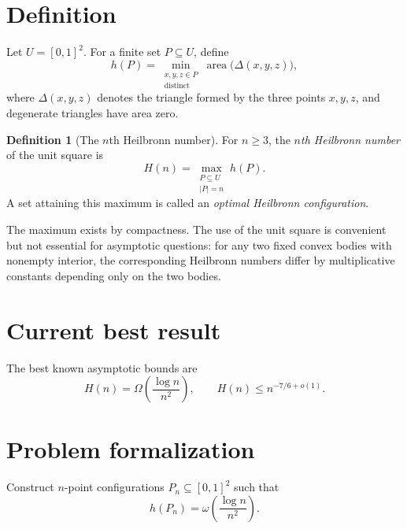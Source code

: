 \documentclass[11pt,a4paper]{article}
\newcommand{\Area}{\operatorname{area}}
\theoremstyle{definition}
\newtheorem{definition}{Definition}
\begin{document}
\section{Definition}
Let $U=[0,1]^2$. For a finite set $P\subseteq U$, define
\begin{equation}\label{eq:delta}
 h(P)
 =\min_{\substack{x,y,z\in P\\\text{distinct}}}
   \Area\bigl(\Delta(x,y,z)\bigr),
\end{equation}
where $\Delta(x,y,z)$ denotes the triangle formed by the three points $x,y,z$,
and degenerate triangles have area zero.

\begin{definition}[The $n$th Heilbronn number]
For $n\geq 3$, the \emph{$n$th Heilbronn number} of the unit square is
\begin{equation}\label{eq:H}
 H(n)=\max_{\substack{P\subseteq U\\|P|=n}} h(P).
\end{equation}
A set attaining this maximum is called an \emph{optimal Heilbronn
configuration}.
\end{definition}

The maximum exists by compactness. The use of the unit square is convenient but
not essential for asymptotic questions: for any two fixed convex bodies with
nonempty interior, the corresponding Heilbronn numbers differ by multiplicative
constants depending only on the two bodies.


\section{Current best result}
The best known asymptotic bounds are
\begin{equation}
  H(n)=\Omega\!\left(\frac{\log n}{n^2}\right),
  \qquad
  H(n)\leq n^{-7/6+o(1)}.
\end{equation}


\section{Problem formalization}

Construct $n$-point configurations $P_n\subseteq[0,1]^2$ such that
\begin{equation}
  h(P_n)=\omega\!\left(\frac{\log n}{n^2}\right).
\end{equation}
\end{document}
